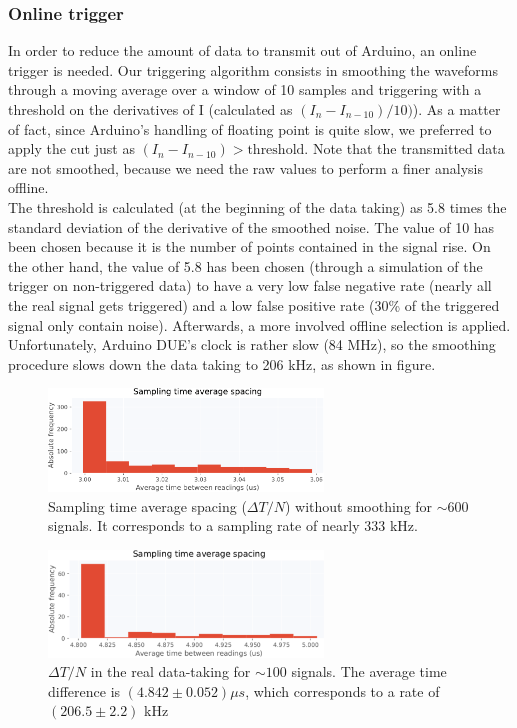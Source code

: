 \documentclass[12pt]{article}
\begin{document}
\subsubsection{Online trigger}
In order to reduce the amount of data to transmit out of Arduino, an online trigger is needed. Our triggering algorithm consists in smoothing the waveforms through a moving average over a window of 10 samples and triggering with a threshold on the derivatives of I (calculated as $(I_n - I_{n-10})/10)$). As a matter of fact, since Arduino's handling of floating point is quite slow, we preferred to apply the cut just as $(I_n - I_{n-10}) > \text{threshold}$. Note that the transmitted data are not smoothed, because we need the raw values to perform a finer analysis offline.\\
The threshold is calculated (at the beginning of the data taking) as 5.8 times the standard deviation of the derivative of the smoothed noise.
The value of 10 has been chosen because it is the number of points contained in the signal rise. On the other hand, the value of 5.8 has been chosen (through a simulation of the trigger on non-triggered data) to have a very low false negative rate (nearly all the real signal gets triggered) and a low false positive rate (30\% of the triggered signal only contain noise). Afterwards, a more involved offline selection is applied.\\
Unfortunately, Arduino DUE's clock is rather slow (84 MHz), so the smoothing procedure slows down the data taking to 206 kHz, as shown in figure.
\begin{figure}[H]
\centering
    \includegraphics[width=0.65\textwidth]{samplingrate_orig.pdf}
    \caption{Sampling time average spacing ($\Delta T / N$) without smoothing for $\sim 600$ signals. It corresponds to a sampling rate of nearly 333 kHz.}
\end{figure}
\vspace{-0.4cm}
\begin{figure}[H]
\centering
    \includegraphics[width=0.65\textwidth]{samplingrate.pdf}
    \caption{$\Delta T / N$ in the real data-taking for $\sim 100$ signals. The average time difference is $(4.842 \pm 0.052) \mu s$, which corresponds to a rate of $(206.5 \pm 2.2)$ kHz}
\end{figure}
\end{document}
